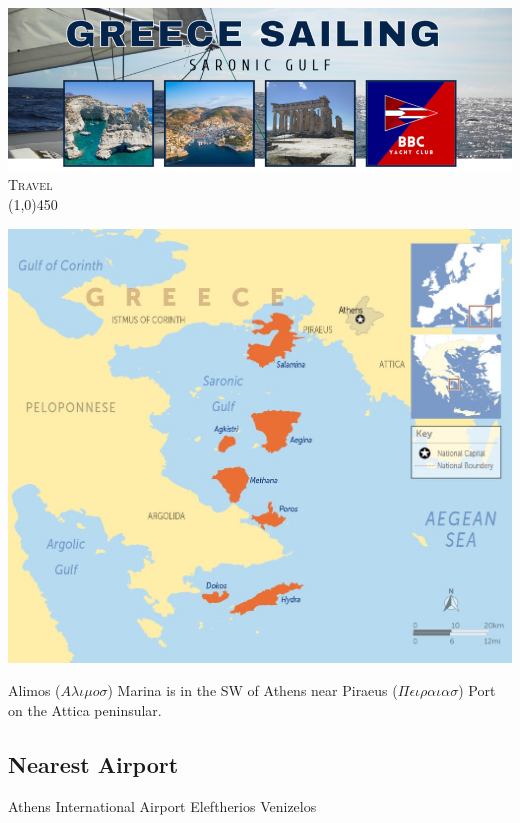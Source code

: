 \documentclass[12pt,a4paper,oneside]{article}
\begin{document}

\begin{center}
\includegraphics[scale=0.5]{../images/saronic_header_small.png} \\[0.2cm]
{\Huge \textsc{Travel}}\\
\line(1,0){450}
\end{center}


\begin{multicols}{2}

\noindent \includegraphics[scale=0.25]{saronic-map.jpg} 

Alimos ($ A\lambda\iota\mu o \sigma $) Marina is in the SW of Athens near Piraeus ($ \Pi\epsilon\iota\rho\alpha\iota\alpha\sigma $) Port on the Attica peninsular.

\subsection*{Nearest Airport}
Athens International Airport Eleftherios Venizelos


\end{multicols}
\end{document}
